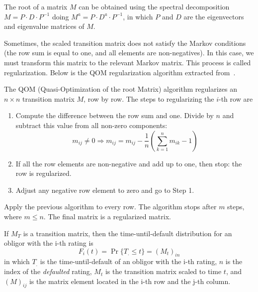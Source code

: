 \documentclass[11pt,fleqn]{book} %
\begin{document}
The root of a matrix $M$ can be obtained using the spectral decomposition
$M = P \cdot D \cdot P^{-1}$ doing $M^{a} = P \cdot D^{a} \cdot P^{-1}$, 
in which $P$ and $D$ are the eigenvectors and eigenvalue matrices of $M$. 

Sometimes, the scaled transition matrix does not satisfy the Markov conditions
(the row sum is equal to one, and all elements are non-negatives). In this case, 
we must transform this matrix to the relevant Markov matrix. This process is 
called regularization. Below is the QOM regularization algorithm extracted 
from~\cite{kreinin:2001}.

\begin{algorithm}
	The QOM (Quasi-Optimization of the root Matrix) algorithm regularizes an 
	$n {\times} n$ transition matrix $M$, row by row. The steps to 
	regularizing the $i$-th row are
	\begin{enumerate}
		\item Compute the difference between the row sum and one. 
		Divide by $n$ and subtract this value from all non-zero components:
		\begin{displaymath}
			m_{ij} \ne 0 
			\Longrightarrow 
			m_{ij} = m_{ij} - \frac{1}{n} \left( \sum_{k=1}^{n} m_{ik} - 1\right)
		\end{displaymath}
		\item If all the row elements are non-negative and add up to one, 
		then stop: the row is regularized.
		\item Adjust any negative row element to zero and go to Step 1.
	\end{enumerate}
	Apply the previous algorithm to every row. The algorithm stops after $m$ 
	steps, where $m \le n$. The final matrix is a regularized matrix. 
\end{algorithm}

\begin{proposition}
	\label{prop:pdftm}
	If $M_T$ is a transition matrix, then the time-until-default distribution 
	for an obligor with the i-th rating is
	\begin{displaymath}
		F_i(t) = \Pr\{T_. \le t\} = \left( M_t \right)_{in}
	\end{displaymath}
	in which $T_.$ is the time-until-default of an obligor with the i-th rating, 
	$n$ is the index of the \emph{defaulted} rating, $M_t$ is the transition 
	matrix scaled to time $t$, and $(M)_{ij}$ is the matrix element located in 
	the i-th row and the j-th column.
\end{proposition}
\end{document}
